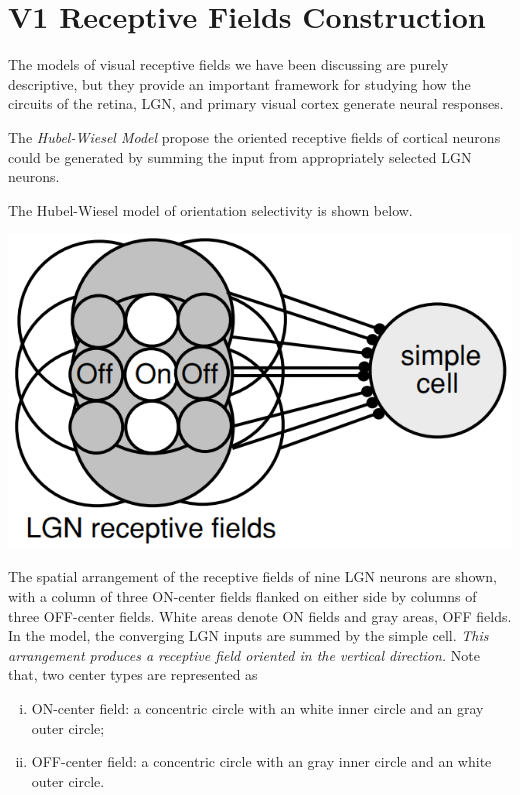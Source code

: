 \section{V1 Receptive Fields Construction}
\label{sec:aMechanisticModel}

\begin{rem}
  The models of visual receptive fields we have been discussing are purely descriptive, but they provide an important framework for studying how the circuits of the retina, LGN, and primary visual cortex generate neural responses.
\end{rem}

\begin{defn}
  \label{defn:Hubel-WieselSimpleCellModel}
  The \emph{Hubel-Wiesel Model} propose the oriented receptive fields of cortical neurons could be generated by summing the input from appropriately selected LGN neurons.
\end{defn}

\begin{exm}
  \label{exm:simpleCellModel}
  The Hubel-Wiesel model of orientation selectivity is shown below.
  \begin{center}
    \includegraphics[scale=0.2]{./png/simpleCellModel}
  \end{center}
  The spatial arrangement of the receptive fields of nine LGN neurons are shown, with a column of three ON-center fields flanked on either side by columns of three OFF-center fields. White areas denote ON fields and gray areas, OFF fields. In the model, the converging LGN inputs are summed by the simple cell. \emph{This arrangement produces a receptive field oriented in the vertical direction.} Note that, two center types are represented as
  \begin{enumerate}[(i)]
  \item ON-center field: a concentric circle with an white inner circle and an gray outer circle;
  \item OFF-center field: a concentric circle with an gray inner circle and an white outer circle.
  \end{enumerate}
\end{exm}

